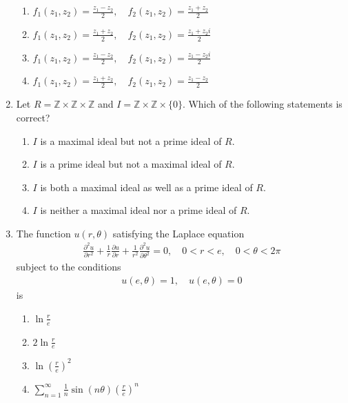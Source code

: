 \documentclass[journal]{IEEEtran}
\numberwithin{equation}{enumi}
\numberwithin{figure}{enumi}
\begin{document}
\begin{enumerate}
\begin{enumerate}
  \item $f_1(z_1, z_2) = \frac{z_1 - z_2}{2}, \quad f_2(z_1, z_2) = \frac{z_1 + z_2}{2}$
  \item $f_1(z_1, z_2) = \frac{z_1 + z_2}{2}, \quad f_2(z_1, z_2) = \frac{z_1 + z_2 i}{2}$
  \item $f_1(z_1, z_2) = \frac{z_1 - z_2}{2}, \quad f_2(z_1, z_2) = \frac{z_1 - z_2 i}{2}$
  \item $f_1(z_1, z_2) = \frac{z_1 + z_2}{2}, \quad f_2(z_1, z_2) = \frac{z_1 - z_2}{2}$
\end{enumerate}


\item
Let $R = \mathbb{Z} \times \mathbb{Z} \times \mathbb{Z}$ and $I = \mathbb{Z} \times \mathbb{Z} \times \{0\}$. Which of the following statements is correct?
\hfill{}

\begin{enumerate}
  \item $I$ is a maximal ideal but not a prime ideal of $R$.
  \item $I$ is a prime ideal but not a maximal ideal of $R$.
  \item $I$ is both a maximal ideal as well as a prime ideal of $R$.
  \item $I$ is neither a maximal ideal nor a prime ideal of $R$.
\end{enumerate}


\item
The function $u(r, \theta)$ satisfying the Laplace equation
\begin{align}
\frac{\partial^2 u}{\partial r^2} + \frac{1}{r} \frac{\partial u}{\partial r} + \frac{1}{r^2} \frac{\partial^2 u}{\partial \theta^2} = 0, \quad 0 < r < e, \quad 0 < \theta < 2\pi
\end{align}
subject to the conditions
\begin{align}
u(e, \theta) = 1, \quad u(e, \theta) = 0
\end{align}
is
\hfill{}
\begin{multicols}{2}
\begin{enumerate}
  \item $\ln \frac{r}{e}$
  \item $2 \ln \frac{r}{e}$
  \item $\ln \left(\frac{r}{e}\right)^2$
  \item $\sum_{n=1}^\infty \frac{1}{n} \sin(n \theta) \left(\frac{r}{e}\right)^n$
\end{enumerate}
\end{multicols}


\end{enumerate}
\end{document}
